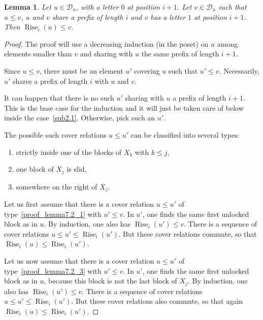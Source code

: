 \documentclass[10pt]{article}
\newtheorem{lemma}[lemma]{Lemma}
\theoremstyle{definition}
\newcommand{\Dyck}{\mathscr{D}}
\DeclareMathOperator{\rise}{Rise}
\begin{document}
\begin{lemma}
  \label{sub_forcer_un}
  Let $u \in \Dyck_n$, with a letter $0$ at position $i+1$. Let
  $v \in \Dyck_n$ such that $u \leq v$, $u$ and $v$ share a prefix of
  length $i$ and $v$ has a letter $1$ at position $i+1$. Then
  $\rise_i(u) \leq v$.
\end{lemma}

\begin{proof}
  The proof will use a decreasing induction (in the poset) on $u$
  among elements smaller than $v$ and sharing with $u$ the same prefix
  of length $i+1$.

  Since $u \leq v$, there must be an element $u'$ covering $u$ such
  that $u' \leq v$. Necessarily, $u'$ shares a prefix of length $i$
  with $u$ and $v$.

  It can happen that there is no such $u'$ sharing with $u$ a prefix
  of length $i+1$. This is the base case for the induction and it will
  just be taken care of below inside the case~\ref{sub2.1}. Otherwise, pick
  such an $u'$.

  \smallskip

  The possible such cover relations $u \leq u'$ can be classified into several types:
  \begin{enumerate}%
  \item\label{proof_lemma7.2_1} strictly inside one of the blocks of $X_k$ with $k \leq j$,
  \item\label{proof_lemma7.2_2} one block of $X_j$ is slid,
  \item\label{proof_lemma7.2_3} somewhere on the right of $X_j$.

  \end{enumerate}

  Let us first assume that there is a cover relation $u \leq u'$ of type~\eqref{proof_lemma7.2_1}
  with $u' \leq v$. In $u'$, one finds the same first unlocked block
  as in $u$. By induction, one also has $\rise_i(u') \leq v$. There
  is a sequence of cover relations $u \leq u' \leq \rise_i(u')$. But these
  cover relations commute, so that $\rise_i(u) \leq \rise_i(u')$.

  Let us now assume that there is a cover relation $u \leq u'$ of type~\eqref{proof_lemma7.2_3} with $u' \leq v$. In $u'$, one finds the same first unlocked
  block as in $u$, because this block is not the last block of
  $X_j$. By induction, one also has $\rise_i(u') \leq v$. There is a
  sequence of cover relations $u \leq u' \leq \rise_i(u')$. But these
  cover relations also commute, so that again
  $\rise_i(u) \leq \rise_i(u')$.


\end{proof}
\end{document}
